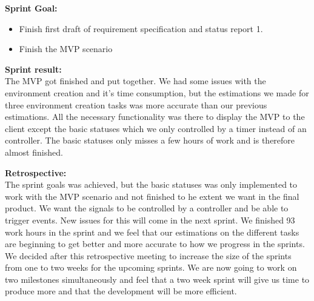\textbf{Sprint Goal:} \\
\begin{itemize}
    \item Finish first draft of requirement specification and status report 1.
    \item Finish the MVP scenario
\end{itemize}

\textbf{Sprint result:} \\
The MVP got finished and put together. We had some issues with the environment creation and it's time consumption, but the estimations we made for three environment creation tasks was more accurate than our previous estimations. All the necessary functionality was there to display the MVP to the client except the basic statuses which we only controlled by a timer instead of an controller. The basic statuses only misses a few hours of work and is therefore almost finished.

\textbf{Retrospective:} \\
The sprint goals was achieved, but the basic statuses was only implemented to work with the MVP scenario and not finished to he extent we want in the final product. We want the signals to be controlled by a controller and be able to trigger events. New issues for this will come in the next sprint. We finished 93 work hours in the sprint and we feel that our estimations on the different tasks are beginning to get better and more accurate to how we progress in the sprints. We decided after this retrospective meeting to increase the size of the sprints from one to two weeks for the upcoming sprints. We are now going to work on two milestones simultaneously and feel that a two week sprint will give us time to produce more and that the development will be more efficient. 



